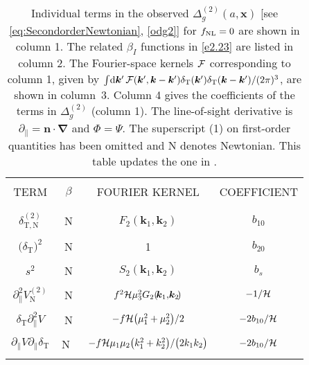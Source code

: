 \begin{landscape}
\begin{longtable}{| c | c | c | c |} 
\caption{ {Individual terms in the observed $\Delta_g^{(2)}(a,\bm{x})$ [see \eqref{eq:SecondorderNewtonian}, \eqref{odg2}] for $f_\text{NL}=0$ are shown in column 1. The related $\beta_I$ functions in \eqref{e2.23} are listed in column 2. The Fourier-space kernels ${\cal F}$  corresponding to column 1, given by 
$ \int \!{\mathrm{d} \bm {k}'}\, {\cal F}(\bm {k}',\bm {k}-\bm {k}')\delta_{\mathrm{T}}(\bm {k}')\delta_{\mathrm{T}}(\bm {k}-\bm {k}')/(2\pi)^3$, are shown in column~3. Column 4 gives
the coefficients of the terms in $\Delta_g^{(2)}$ (column 1). The line-of-sight derivative is $\partial_\|=\bm{n}\!\cdot\!\bm{\nabla}$ and $\Phi=\Psi$.
The superscript (1) on first-order quantities has been omitted and N denotes Newtonian. This table updates the one in \cite{Jolicoeur:2017nyt}.}} \label{tabc1} \\
\hline 
&  &  & \\
TERM & $~~\beta~~$ & FOURIER KERNEL    & COEFFICIENT \\ 
&  &  & \\ \hline \hline
&  &  & \\
$\delta^{(2)}_{\mathrm{T,{N}}}$ & N & $F_{2}(\!\bm{k}_{1},\!\bm{k}_{2}\!)$ & $b_{10}$ \\ 
&  &  & \\
${\big(\delta_{\mathrm{T}}\big)^2}$ & N & 1 & $b_{20}$ \\ 
&  &  & \\
${s^2}$ & N & $S_2(\!\bm{k}_{1},\!\bm{k}_{2}\!)$ & $b_{s}$ \\ 
&  &  & \\
$\partial_{\parallel}^{2}V^{(2)}_{{\mathrm{N}}}$ & N & $f^{2}\mathcal{H} \mu_{3}^{2}G_{2}(\!\bm{k}_{1},\!\bm{k}_{2}\!)$ & $-1/\mathcal{H}$ \\ 
&  &  & \\
$\delta_{\mathrm{T}}\partial_{\parallel}^{2}V$ & N & $-f\mathcal{H} \big(\mu_{1}^{2} + \mu_{2}^{2}\big)/2 $ & $-2b_{10}/\mathcal{H}$ \\
&  &  & \\ 
$\partial_{\parallel}V \partial_{\parallel}\delta_{\mathrm{T}}$ & N\ & $-f\mathcal{H} {{\mu_{1}\mu_{2}\big(k_{1}^{2} + k_{2}^{2}\big)}/{\big(2k_{1}k_{2}\big)}}$& $-2b_{10}/\mathcal{H}$ \\ 
&  &  & \\

\end{longtable}
\end{landscape}
